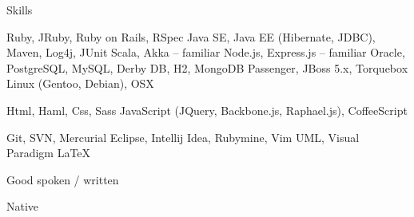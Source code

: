 \begin{rubric}{Skills}

\entry*
  Ruby, JRuby, Ruby on Rails, RSpec
\entry*
  Java SE, Java EE (Hibernate, JDBC), Maven, Log4j, JUnit
\entry*
  Scala, Akka – familiar
\entry*
  Node.js, Express.js – familiar  
\entry*
  Oracle, PostgreSQL, MySQL, Derby DB, H2, MongoDB
\entry*
  Passenger, JBoss 5.x, Torquebox
\entry*
  Linux (Gentoo, Debian), OSX

\entry*
  Html, Haml, Css, Sass
\entry*
  JavaScript (JQuery, Backbone.js, Raphael.js), CoffeeScript

\entry*
  Git, SVN, Mercurial
\entry*  
  Eclipse, Intellij Idea, Rubymine, Vim
\entry*
  UML, Visual Paradigm
\entry*
  LaTeX


\entry*[English:]
  Good spoken / written

\entry*[Polish:]
  Native

\end{rubric}
